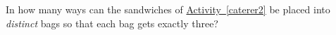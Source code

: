\documentclass{book}
\begin{document}
\setcounter{cpjt}{280}
\addtocounter{cpjt}{-1}
\begin{activity}\label{activity-273}
\hypertarget{p-1423}{}%
In how many ways can the sandwiches of \hyperref[caterer2]{Activity~\ref{caterer2}} be placed into \emph{distinct} bags so that each bag gets exactly three?%
\par\smallskip%
\noindent\end{activity}

\clearpage
\end{document}
